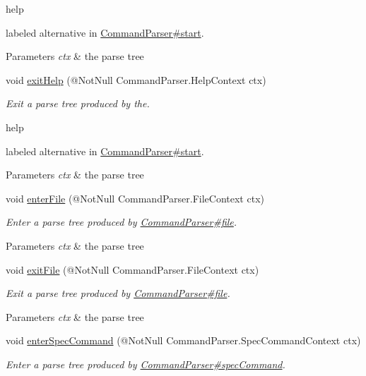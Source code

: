 \begin{DoxyCompactItemize}
\begin{DoxyCompactList}
\begin{DoxyCode}
help 
\end{DoxyCode}
 labeled alternative in \hyperlink{}{Command\+Parser\#start}. 
\begin{DoxyParams}{Parameters}
{\em ctx} & the parse tree\\
\hline
\end{DoxyParams}
 \end{DoxyCompactList}\item 
void \hyperlink{classedu_1_1udel_1_1cis_1_1vsl_1_1civl_1_1run_1_1common_1_1CommandBaseListener_a6a51de7c4f8b3a6cc266eb16fa79d895}{exit\+Help} (@Not\+Null Command\+Parser.\+Help\+Context ctx)
\begin{DoxyCompactList}\small\item\em Exit a parse tree produced by the.


\begin{DoxyCode}
help 
\end{DoxyCode}
 labeled alternative in \hyperlink{}{Command\+Parser\#start}. 
\begin{DoxyParams}{Parameters}
{\em ctx} & the parse tree\\
\hline
\end{DoxyParams}
 \end{DoxyCompactList}\item 
void \hyperlink{classedu_1_1udel_1_1cis_1_1vsl_1_1civl_1_1run_1_1common_1_1CommandBaseListener_a687ca14039ce6041dfe2f4e4991ba16a}{enter\+File} (@Not\+Null Command\+Parser.\+File\+Context ctx)
\begin{DoxyCompactList}\small\item\em Enter a parse tree produced by \hyperlink{}{Command\+Parser\#file}.


\begin{DoxyParams}{Parameters}
{\em ctx} & the parse tree\\
\hline
\end{DoxyParams}
 \end{DoxyCompactList}\item 
void \hyperlink{classedu_1_1udel_1_1cis_1_1vsl_1_1civl_1_1run_1_1common_1_1CommandBaseListener_a281a9e2e4a2f0b86107e8417e85b9efa}{exit\+File} (@Not\+Null Command\+Parser.\+File\+Context ctx)
\begin{DoxyCompactList}\small\item\em Exit a parse tree produced by \hyperlink{}{Command\+Parser\#file}.


\begin{DoxyParams}{Parameters}
{\em ctx} & the parse tree\\
\hline
\end{DoxyParams}
 \end{DoxyCompactList}\item 
void \hyperlink{classedu_1_1udel_1_1cis_1_1vsl_1_1civl_1_1run_1_1common_1_1CommandBaseListener_a556226f2e10c6f6ebf0f975f90a8a7f2}{enter\+Spec\+Command} (@Not\+Null Command\+Parser.\+Spec\+Command\+Context ctx)
\begin{DoxyCompactList}\small\item\em Enter a parse tree produced by \hyperlink{}{Command\+Parser\#spec\+Command}.



\end{DoxyCompactList}
\end{DoxyCompactItemize}
